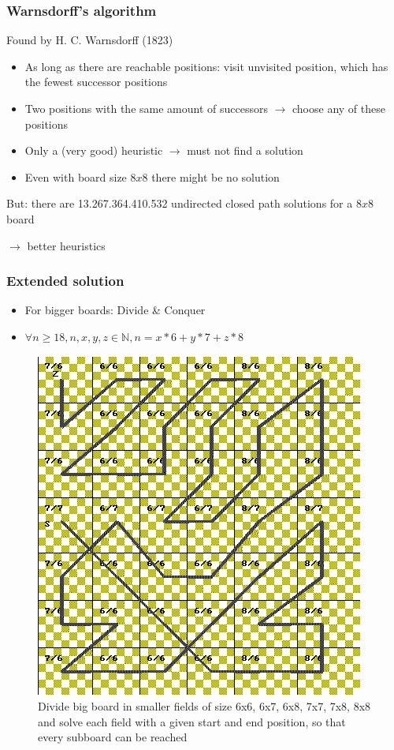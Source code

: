 \documentclass{beamer}
\begin{document}
\begin{frame}
\frametitle{Warnsdorff's algorithm}
Found by H. C. Warnsdorff (1823)\par
\begin{itemize}
	\item As long as there are reachable positions: visit unvisited position,
	which has the fewest successor positions
	\item Two positions with the same amount of successors $\rightarrow$
	choose any of these positions
	\item Only a (very good) heuristic $\rightarrow$ must not find a solution
	\item Even with board size $8x8$ there might be no solution
\end{itemize}

But: there are 13.267.364.410.532 undirected closed path solutions for a $8x8$ board

 $\rightarrow$ better heuristics 

\end{frame}

\begin{frame}
\frametitle{Extended solution}
\begin{itemize}
	\item For bigger boards: Divide \& Conquer
	\item $\forall n \geq 18, n, x, y, z \in \mathbb N, n = x*6 + y*7 + z * 8$
\end{itemize}

\begin{figure}
\includegraphics[scale=0.35]{spripic1}
\caption{Divide big board in smaller fields of size 6x6, 6x7, 6x8, 7x7, 7x8, 8x8
	and solve each field with a given start and end position, so that every subboard
	can be reached}
\end{figure}
\end{frame}
\end{document}
